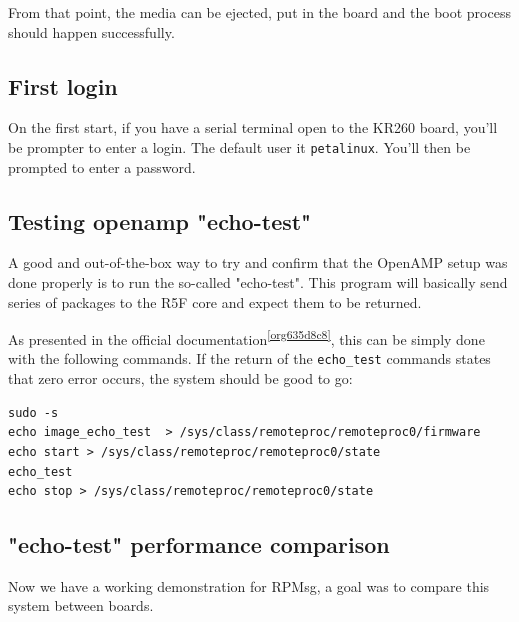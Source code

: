\documentclass[10pt]{article}
\begin{document}
From that point, the media can be ejected, put in the board and the boot process
should happen successfully.

\subsection{First login}
\label{sec:orgc079737}
On the first start, if you have a serial terminal open to the KR260 board, you'll be prompter to enter a login.
The default user it \texttt{petalinux}. You'll then be prompted to enter a password.

\subsection{Testing openamp "echo-test"}
\label{sec:orgfa80011}
A good and out-of-the-box way to try and confirm that the OpenAMP setup was done
properly is to run the so-called "echo-test". This program will basically send
series of packages to the R5F core and expect them to be returned.

As presented in the official documentation\textsuperscript{\ref{org635d8c8}}, this can be simply done with
the following commands. If the return of the \texttt{echo\_test} commands states that zero
error occurs, the system should be good to go:
\begin{verbatim}
sudo -s
echo image_echo_test  > /sys/class/remoteproc/remoteproc0/firmware
echo start > /sys/class/remoteproc/remoteproc0/state
echo_test
echo stop > /sys/class/remoteproc/remoteproc0/state
\end{verbatim}

\subsection{"echo-test" performance comparison}
\label{sec:orgab4b1f2}

Now we have a working demonstration for RPMsg, a goal was to compare this system between boards.
\end{document}
